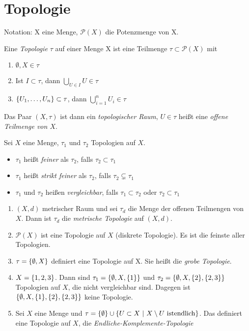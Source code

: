 \section{Topologie}

Notation: X eine Menge, $\mathcal{P}(X)$ die Potenzmenge von X.

\begin{dfn}
    Eine \emph{Topologie} $\tau$ auf einer Menge X ist eine Teilmenge
    $\tau\subset\mathcal{P}(X)$ mit
    \begin{enumerate}
        \item $\emptyset, X \in \tau$
        \item Ist $I\subset \tau$, dann $\bigcup_{U\in I} U \in\tau$
        \item $\mdef{U_1, \ldots, U_n} \subset \tau$, dann
            $\bigcup_{i=1}^n U_i \in \tau$
    \end{enumerate}
    Das Paar $(X, \tau)$ ist dann ein \emph{topologischer Raum}, $U\in\tau$ heißt
    eine \emph{offene Teilmenge von $X$}.
\end{dfn}

\begin{dfn}
    Sei $X$ eine Menge, $\tau_1$ und $\tau_2$ Topologien auf $X$.
    \begin{itemize}
        \item $\tau_1$ heißt \emph{feiner} als $\tau_2$, falls $\tau_2\subset\tau_1$
        \item $\tau_1$ heißt \emph{strikt feiner} als $\tau_2$, falls
            $\tau_2\subsetneq\tau_1$
        \item $\tau_1$ und $\tau_2$ heißen \emph{vergleichbar}, falls
            $\tau_1\subset\tau_2$ oder $\tau_2\subset\tau_1$
    \end{itemize}
\end{dfn}

\begin{bsps}
    \begin{enumerate}
        \item $(X,d)$ metrischer Raum und sei $\tau_d$ die Menge der offenen
            Teilmengen von $X$. Dann ist $\tau_d$ die \emph{metrische Topologie}
            auf $(X,d)$.
        \item $\mathcal{P}(X)$ ist eine Topologie auf $X$ (diskrete Topologie). Es
            ist die feinste aller Topologien.
        \item $\tau = \mdef{\emptyset, X}$ definiert eine Topologie auf X. Sie
            heißt die \emph{grobe Topologie}.
        \item $X=\mdef{1,2,3}$. Dann sind $\tau_1=\mdef{\emptyset,X,\mdef{1}}$ und
            $\tau_2=\mdef{\emptyset, X, \mdef{2}, \mdef{2,3}}$ Topologien auf $X$,
            die nicht vergleichbar sind. Dagegen ist
            $\mdef{\emptyset, X, \mdef{1}, \mdef{2}, \mdef{2,3}}$ keine Topologie.
        \item Sei $X$ eine Menge und
            $\tau = \mdef{\emptyset}\cup\mdef[U\subset X]{X\setminus U \
            \mathrm{ist endlich}}$.  Das definiert eine Topologie auf $X$, die
            \emph{Endliche-Komplemente-Topologie}
    \end{enumerate}
\end{bsps}


